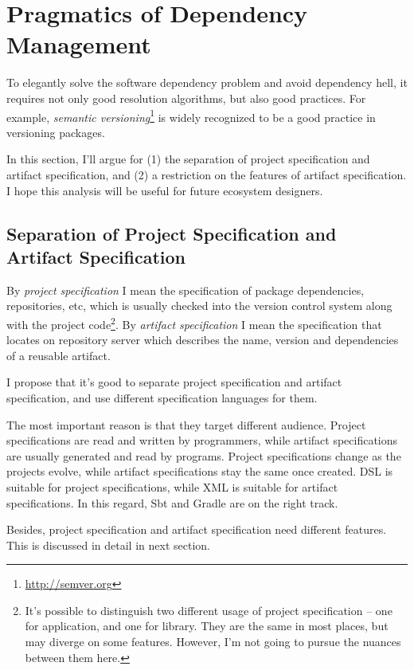 \section{Pragmatics of Dependency Management}

To elegantly solve the software dependency problem and avoid dependency hell, it requires not only good resolution algorithms, but also good practices. For example, \emph{semantic versioning}\footnote{\url{http://semver.org}} is widely recognized to be a good practice in versioning packages.

In this section, I'll argue for (1) the separation of project specification and artifact specification, and (2) a restriction on the features of artifact specification. I hope this analysis will be useful for future ecosystem designers.

\subsection{Separation of Project Specification and Artifact Specification}

By \emph{project specification} I mean the specification of package dependencies, repositories, etc, which is usually checked into the version control system along with the project code\footnote{It's possible to distinguish two different usage of project specification -- one for application, and one for library. They are the same in most places, but may diverge on some features. However, I'm not going to pursue the nuances between them here.}. By \emph{artifact specification} I mean the specification that locates on repository server which describes the name, version and dependencies of a reusable artifact.

I propose that it's good to separate project specification and artifact specification, and use different specification languages for them.

The most important reason is that they target different audience. Project specifications are read and written by programmers, while artifact specifications are usually generated and read by programs. Project specifications change as the projects evolve, while artifact specifications stay the same once created. DSL is suitable for project specifications, while XML is suitable for artifact specifications. In this regard, Sbt and Gradle are on the right track.

Besides, project specification and artifact specification need different features. This is discussed in detail in next section.


